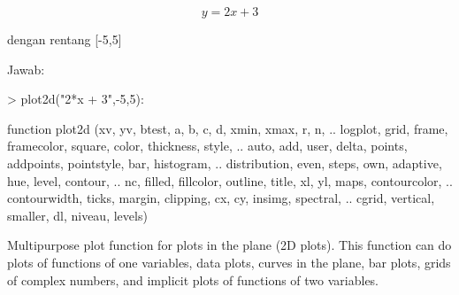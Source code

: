 \documentclass[a4paper,10pt]{article}
\begin{document}
\begin{eulernotebook}
\begin{eulercomment}
\begin{eulercomment}
\begin{eulercomment}
\begin{eulercomment}
\begin{eulercomment}
\begin{eulercomment}
\begin{eulercomment}
\begin{eulercomment}
\begin{eulercomment}
\end{eulercomment}
\begin{eulerformula}
\[
y = 2x + 3
\]
\end{eulerformula}
\begin{eulercomment}
\end{eulercomment}
\begin{eulerttcomment}
   dengan rentang [-5,5]
\end{eulerttcomment}
\begin{eulercomment}
Jawab:
\end{eulercomment}
\begin{eulerprompt}
> plot2d("2*x + 3",-5,5):
\end{eulerprompt}
\begin{eulercomment}
\end{eulercomment}
\begin{eulerttcomment}
  function plot2d (xv, yv, btest, a, b, c, d, xmin, xmax, r, n,  ..
  logplot, grid, frame, framecolor, square, color, thickness, style, ..
  auto, add, user, delta, points, addpoints, pointstyle, bar, histogram,  ..
  distribution, even, steps, own, adaptive, hue, level, contour,  ..
  nc, filled, fillcolor, outline, title, xl, yl, maps, contourcolor, ..
  contourwidth, ticks, margin, clipping, cx, cy, insimg, spectral,  ..
  cgrid, vertical, smaller, dl, niveau, levels)
\end{eulerttcomment}
\begin{eulercomment}
Multipurpose plot function for plots in the plane (2D plots). This function can do
plots of functions of one variables, data plots, curves in the plane, bar plots, grids
of complex numbers, and implicit plots of functions of two variables.


\end{eulercomment}
\end{eulercomment}
\end{eulercomment}
\end{eulercomment}
\end{eulercomment}
\end{eulercomment}
\end{eulercomment}
\end{eulercomment}
\end{eulercomment}
\end{eulernotebook}
\end{document}
